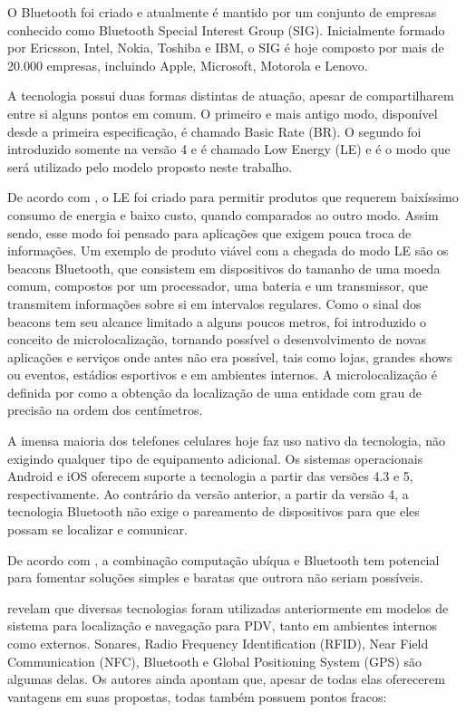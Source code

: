 \documentclass[english,brazilian]{UNISINOSmonografia}
\begin{document}
O Bluetooth foi criado e atualmente é mantido por um conjunto de empresas conhecido como Bluetooth Special Interest Group (SIG). Inicialmente formado por Ericsson, Intel, Nokia, Toshiba e IBM, o SIG é hoje composto por mais de 20.000 empresas, incluindo Apple, Microsoft, Motorola e Lenovo.

A tecnologia possui duas formas distintas de atuação, apesar de compartilharem entre si alguns pontos em comum. O primeiro e mais antigo modo, disponível desde a primeira especificação, é chamado Basic Rate (BR). O segundo foi introduzido somente na versão 4 e é chamado Low Energy (LE) e é o modo que será utilizado pelo modelo proposto neste trabalho.

De acordo com , o LE foi criado para permitir produtos que requerem baixíssimo consumo de energia e baixo custo, quando comparados ao outro modo. Assim sendo, esse modo foi pensado para aplicações que exigem pouca troca de informações. Um exemplo de produto viável com a chegada do modo LE são os beacons Bluetooth, que consistem em dispositivos do tamanho de uma moeda comum, compostos por um processador, uma bateria e um transmissor, que transmitem informações sobre si em intervalos regulares. Como o sinal dos beacons tem seu alcance limitado a alguns poucos metros, foi introduzido o conceito de microlocalização, tornando possível o desenvolvimento de novas aplicações e serviços onde antes não era possível, tais como lojas, grandes shows ou eventos, estádios esportivos e em ambientes internos. A microlocalização é definida por  como a obtenção da localização de uma entidade com grau de precisão na ordem dos centímetros. 

A imensa maioria dos telefones celulares hoje faz uso nativo da tecnologia, não exigindo qualquer tipo de equipamento adicional. Os sistemas operacionais Android e iOS oferecem suporte a tecnologia a partir das versões 4.3 e 5, respectivamente. Ao contrário da versão anterior, a partir da versão 4, a tecnologia Bluetooth não exige o pareamento de dispositivos para que eles possam se localizar e comunicar.

De acordo com , a combinação computação ubíqua e Bluetooth tem potencial para fomentar soluções simples e baratas que outrora não seriam possíveis.

 revelam que diversas tecnologias foram utilizadas anteriormente em modelos de sistema para localização e navegação para PDV, tanto em ambientes internos como externos. Sonares, Radio Frequency Identification (RFID), Near Field Communication (NFC), Bluetooth e Global Positioning System (GPS) são algumas delas. Os autores ainda apontam que, apesar de todas elas oferecerem vantagens em suas propostas, todas também possuem pontos fracos:
\end{document}
